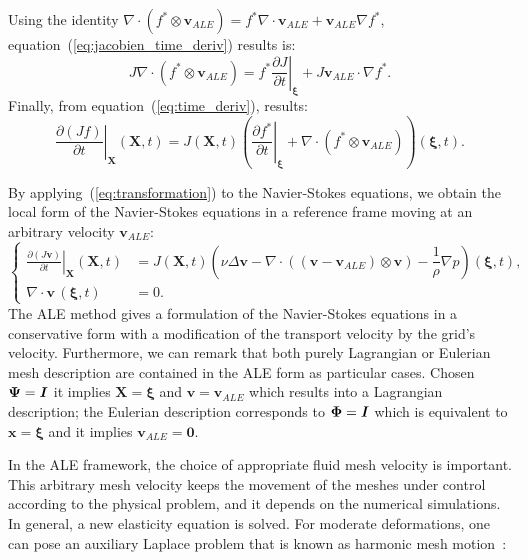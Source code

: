 Using the identity $ \nabla \cdot (f^* \otimes \mathbf{v}_{ALE}) = f^* \nabla \cdot \mathbf{v}_{ALE} + \mathbf{v}_{ALE} \nabla f^*$, equation~(\ref{eq:jacobien_time_deriv}) results is:
\begin{equation}
J  \nabla \cdot (f^* \otimes \mathbf{v}_{ALE}) =  f^*\left.\frac{\partial J}{ \partial t} \right|_{\boldsymbol{\xi}} +  J \mathbf{v}_{ALE} \cdot \nabla f^*.
\label{eq:time_deriv}
\end{equation}
Finally, from equation~(\ref{eq:time_deriv}), results:
\begin{equation}
\left.\frac{\partial (J  f)}{ \partial t} \right|_{\mathbf{X}}  (\mathbf{X},t) =  J(\mathbf{X},t) \left( \left.\frac{\partial f^*}{ \partial t}\right|_{\boldsymbol{\xi}} +  \nabla \cdot (f^* \otimes \mathbf{v}_{ALE}) \right) (\boldsymbol{\xi}, t ).
\label{eq:transformation}
\end{equation}
 
By applying~(\ref{eq:transformation}) to the Navier-Stokes equations, we obtain the local form of the Navier-Stokes equations in a reference frame moving at an arbitrary velocity $\mathbf{v}_{ALE}$:
\begin{equation}\label{eq:NS_ALE}
\left\{
\begin{aligned}
\left.\frac{\partial (J \mathbf{v})}{\partial t} \right|_{\mathbf{X}} (\mathbf{X},t) &=  J(\mathbf{X},t)  \left(\nu\Delta \mathbf{v}   - \nabla \cdot  \left( (\mathbf{v} - \mathbf{v}_{ALE}) \otimes \mathbf{v} \right)  - \dfrac{1}{\rho}\nabla p\right) (\boldsymbol{\xi}, t ), \\
\nabla \cdot   \mathbf{v} \, (\boldsymbol{\xi}, t ) &= 0.
\end{aligned}
\right.
\end{equation}
The ALE method gives a formulation of the Navier-Stokes equations in a conservative form with a modification of the transport velocity by the grid's velocity.
Furthermore, we can remark that both purely Lagrangian or Eulerian mesh description are contained in the ALE form as particular cases. Chosen $\mathbf{\Psi} = \textbf{\textit{I}}$ it implies $\mathbf{X} = \boldsymbol{\xi} $ and $\mathbf{v} = \mathbf{v}_{ALE}$ which results into a Lagrangian description; the Eulerian  description corresponds to $\mathbf{\Phi} = \textbf{\textit{I}}$ which is equivalent to $\mathbf{x} = \boldsymbol{\xi} $ and it implies $\mathbf{v}_{ALE} = \mathbf{0}$.

In the ALE framework, the choice of appropriate fluid mesh
velocity is important. This arbitrary mesh velocity keeps the movement of the meshes under control according to the physical problem, and it depends on the numerical simulations. In general, a new elasticity equation is solved. For moderate deformations, one can pose an auxiliary Laplace problem that is known as harmonic mesh motion~\cite{duarte2004arbitrary}:

